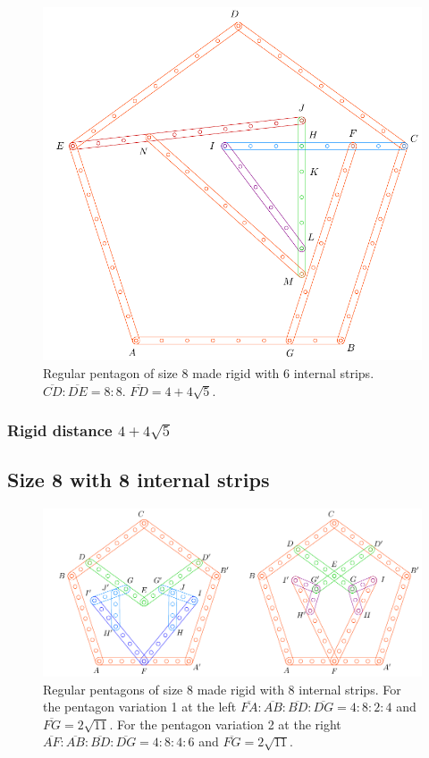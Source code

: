 \documentclass[11pt]{article}
\begin{document}
\begin{figure}[H]
\centering
\includegraphics[scale=0.8]{8/penta8-6a}
\caption{Regular pentagon of size 8 made rigid with 6 internal strips. $\overline{CD} : \overline{DE} = 8:8$. $\overline{FD} = 4 + 4\sqrt5$.}
\label{fig:penta8-6a}
\end{figure}

\subsubsection{Rigid distance $4 + 4\sqrt5$}

\subsection{Size 8 with 8 internal strips}

\begin{figure}[H]
\centering
\includegraphics[scale=1]{8/penta8-8a}
\caption{Regular pentagons of size 8 made rigid with 8 internal strips. For the pentagon variation 1 at the left $\overline{FA}:\overline{AB}:\overline{BD}:\overline{DG} = 4:8:2:4$ and $\overline{FG}=2\sqrt{11}$. For the pentagon variation 2 at the right $\overline{AF}:\overline{AB}:\overline{BD}:\overline{DG} = 4:8:4:6$ and $\overline{FG}=2\sqrt{11}$.}
\label{fig:penta8-8a}
\end{figure}
\end{document}
